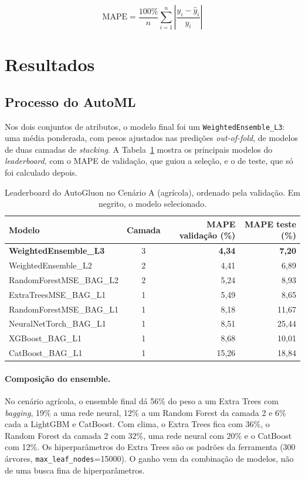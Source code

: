 \documentclass[a4paper,11pt]{article}
\begin{document}
\begin{equation}
\text{MAPE} = \frac{100\%}{n}\sum_{i=1}^{n}\left|\frac{y_i - \hat{y}_i}{y_i}\right|
\label{eq:mape}
\end{equation}

\section{Resultados}

\subsection{Processo do AutoML}

Nos dois conjuntos de atributos, o modelo final foi um \texttt{WeightedEnsemble\_L3}: uma
média ponderada, com pesos ajustados nas predições \textit{out-of-fold}, de modelos de duas
camadas de \textit{stacking}. A Tabela~\ref{tab:leaderboard} mostra os principais modelos do
\textit{leaderboard}, com o MAPE de validação, que guiou a seleção, e o de teste, que só foi
calculado depois.

\begin{table}[H]
\centering
\caption{Leaderboard do AutoGluon no Cenário A (agrícola), ordenado pela validação. Em negrito, o modelo selecionado.}
\label{tab:leaderboard}
\begin{tabular}{@{}lcrr@{}}
\toprule
Modelo & Camada & MAPE validação (\%) & MAPE teste (\%) \\
\midrule
\textbf{WeightedEnsemble\_L3} & 3 & \textbf{4,34} & \textbf{7,20} \\
WeightedEnsemble\_L2 & 2 & 4,41 & 6,89 \\
RandomForestMSE\_BAG\_L2 & 2 & 5,24 & 8,93 \\
ExtraTreesMSE\_BAG\_L1 & 1 & 5,49 & 8,65 \\
RandomForestMSE\_BAG\_L1 & 1 & 8,18 & 11,67 \\
NeuralNetTorch\_BAG\_L1 & 1 & 8,51 & 25,44 \\
XGBoost\_BAG\_L1 & 1 & 8,68 & 10,01 \\
CatBoost\_BAG\_L1 & 1 & 15,26 & 18,84 \\
\bottomrule
\end{tabular}
\end{table}

\paragraph{Composição do ensemble.} No cenário agrícola, o ensemble final dá 56\% do peso a
um Extra Trees com \textit{bagging}, 19\% a uma rede neural, 12\% a um Random Forest da
camada 2 e 6\% cada a LightGBM e CatBoost. Com clima, o Extra Trees fica com 36\%, o Random
Forest da camada 2 com 32\%, uma rede neural com 20\% e o CatBoost com 12\%. Os
hiperparâmetros do Extra Trees são os padrões da ferramenta (300 árvores,
\texttt{max\_leaf\_nodes}=15000). O ganho vem da combinação de modelos, não de uma busca
fina de hiperparâmetros.
\end{document}
